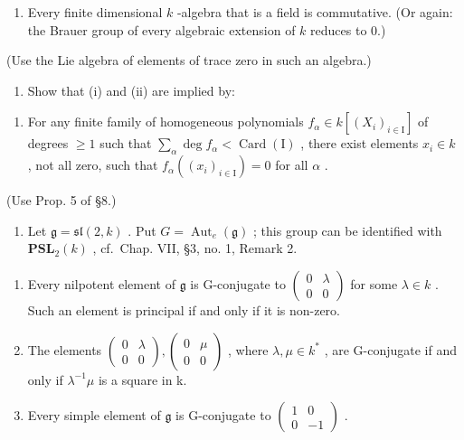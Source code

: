 \begin{enumerate}
\def\labelenumi{(\roman{enumi})}
\setcounter{enumi}{2}
\tightlist
\item
  Every finite dimensional \(k\) -algebra that is a field is commutative. (Or again: the Brauer group of every algebraic extension of \(k\) reduces to 0.)
\end{enumerate}

(Use the Lie algebra of elements of trace zero in such an algebra.)

\begin{enumerate}
\def\labelenumi{\alph{enumi})}
\setcounter{enumi}{2}
\tightlist
\item
  Show that (i) and (ii) are implied by:
\end{enumerate}

\begin{enumerate}
\def\labelenumi{(\roman{enumi})}
\setcounter{enumi}{3}
\tightlist
\item
  For any finite family of homogeneous polynomials \(f_{\alpha} \in k[(X_i)_{i \in \mathrm{I}}]\) of degrees \(\geq 1\) such that \(\sum_{\alpha} \deg f_{\alpha} < \operatorname{Card}(\mathrm{I})\) , there exist elements \(x_i \in k\) , not all zero, such that \(f_{\alpha}((x_i)_{i \in \mathrm{I}}) = 0\) for all \(\alpha\) .
\end{enumerate}

(Use Prop. 5 of §8.)


\begin{enumerate}
\def\labelenumi{\arabic{enumi})}
\tightlist
\item
  Let \(\mathfrak{g} = \mathfrak{sl}(2, k)\) . Put \(G = \operatorname{Aut}_e(\mathfrak{g})\) ; this group can be identified with \(\mathbf{PSL}_2(k)\) , cf.~Chap. VII, §3, no. 1, Remark 2.
\end{enumerate}

\begin{enumerate}
\def\labelenumi{\alph{enumi})}
\item
  Every nilpotent element of \(\mathfrak{g}\) is G-conjugate to \(\left( \begin{array}{cc}0 & \lambda \\ 0 & 0 \end{array} \right)\) for some \(\lambda \in k\) . Such an element is principal if and only if it is non-zero.
\item
  The elements \(\begin{pmatrix}0&\lambda\\0&0\end{pmatrix},\begin{pmatrix}0&\mu\\0&0\end{pmatrix}\) , where \(\lambda,\mu\in k^{*}\) , are G-conjugate if and only if \(\lambda^{-1}\mu\) is a square in k.
\item
  Every simple element of \(\mathfrak{g}\) is G-conjugate to \(\left( \begin{array}{cc}1 & 0\\ 0 & -1 \end{array} \right)\) .
\end{enumerate}

